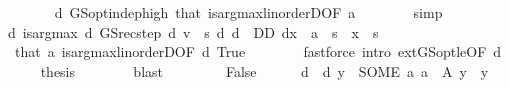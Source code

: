 \begin{isabellebody}
\ \ \ \ \ \ \isamarkupfalse%
\ d\ GS{\isacharunderscore}{\kern0pt}opt{\isacharunderscore}{\kern0pt}indep{\isacharunderscore}{\kern0pt}high\ that\ is{\isacharunderscore}{\kern0pt}arg{\isacharunderscore}{\kern0pt}max{\isacharunderscore}{\kern0pt}linorderD{\isacharparenleft}{\kern0pt}{}{\isacharparenright}{\kern0pt}{\isacharbrackleft}{\kern0pt}OF\ a{\isacharbrackright}{\kern0pt}\isanewline
\ \ \ \ \ \ \isamarkupfalse%
\ simp\isanewline
\ \ \ \ \isamarkupfalse%
\ d{\isacharprime}{\kern0pt}{\isacharcolon}{\kern0pt}\ {\isachardoublequoteopen}is{\isacharunderscore}{\kern0pt}arg{\isacharunderscore}{\kern0pt}max\ {\isacharparenleft}{\kern0pt}{\isasymlambda}d{\isachardot}{\kern0pt}\ GS{\isacharunderscore}{\kern0pt}rec{\isacharunderscore}{\kern0pt}step\ d\ v\ {\isachardollar}{\kern0pt}\ s{\isacharprime}{\kern0pt}{\isacharparenright}{\kern0pt}\ {\isacharparenleft}{\kern0pt}{\isasymlambda}d{\isachardot}{\kern0pt}\ d\ {\isasymin}\ D\isactrlsub D{\isacharparenright}{\kern0pt}\ {\isacharparenleft}{\kern0pt}d{\isacharparenleft}{\kern0pt}x\ {\isacharcolon}{\kern0pt}{\isacharequal}{\kern0pt}\ a{\isacharparenright}{\kern0pt}{\isacharparenright}{\kern0pt}{\isachardoublequoteclose}\ \ {\isachardoublequoteopen}s{\isacharprime}{\kern0pt}\ {\isasymle}\ x{\isachardoublequoteclose}\ \ s{\isacharprime}{\kern0pt}\isanewline
\ \ \ \ \ \ \isamarkupfalse%
\ \ that\ a\ is{\isacharunderscore}{\kern0pt}arg{\isacharunderscore}{\kern0pt}max{\isacharunderscore}{\kern0pt}linorderD{\isacharbrackleft}{\kern0pt}OF\ d{\isacharbrackright}{\kern0pt}\ True\isanewline
\ \ \ \ \ \ \isamarkupfalse%
\ {\isacharparenleft}{\kern0pt}fastforce\ intro{\isacharbang}{\kern0pt}{\isacharcolon}{\kern0pt}\ ext{\isacharunderscore}{\kern0pt}GS{\isacharunderscore}{\kern0pt}opt{\isacharunderscore}{\kern0pt}le{\isacharbrackleft}{\kern0pt}OF\ d{\isacharbrackright}{\kern0pt}{\isacharparenright}{\kern0pt}\isanewline
\ \ \ \ \isamarkupfalse%
\ {\isacharquery}{\kern0pt}thesis\isanewline
\ \ \ \ \ \ \isamarkupfalse%
\ blast\isanewline
\ \ \isamarkupfalse%
\isanewline
\ \ \ \ \isamarkupfalse%
\ False\isanewline
\ \ \ \ \isamarkupfalse%
\ d\ \ {\isachardoublequoteopen}d\ y\ {\isacharequal}{\kern0pt}\ {\isacharparenleft}{\kern0pt}SOME\ a{\isachardot}{\kern0pt}\ a\ {\isasymin}\ A\ y{\isacharparenright}{\kern0pt}{\isachardoublequoteclose}\ \ y\isanewline
\ \ \ \ \isamarkupfalse%

\end{isabellebody}
